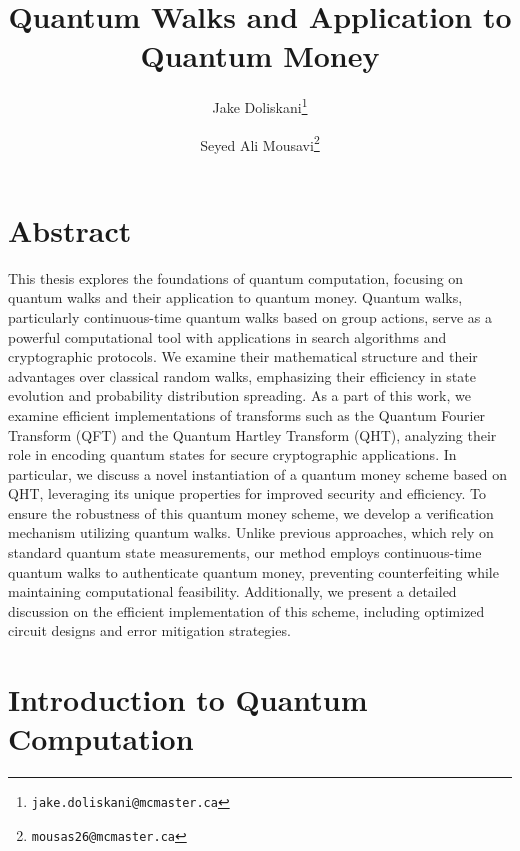 \documentclass[11pt]{article}
\title{Quantum Walks and Application to Quantum Money}
\author{Jake Doliskani\thanks{\tt jake.doliskani@mcmaster.ca} }
\author{Seyed Ali Mousavi\thanks{\tt mousas26@mcmaster.ca} }
\affil{Department of Computing and Software, McMaster University}
\date{}
\theoremstyle{definition}
\begin{document}
\maketitle

\newpage
\section*{Abstract}

This thesis explores the foundations of quantum computation, focusing on quantum walks and their application to quantum money. Quantum walks, particularly continuous-time quantum walks based on group actions, serve as a powerful computational tool with applications in search algorithms and cryptographic protocols. We examine their mathematical structure and their advantages over classical random walks, emphasizing their efficiency in state evolution and probability distribution spreading. As a part of this work, we examine efficient implementations of transforms such as the Quantum Fourier Transform (QFT) and the Quantum Hartley Transform (QHT), analyzing their role in encoding quantum states for secure cryptographic applications. In particular, we discuss a novel instantiation of a quantum money scheme based on QHT, leveraging its unique properties for improved security and efficiency.
To ensure the robustness of this quantum money scheme, we develop a verification mechanism utilizing quantum walks. Unlike previous approaches, which rely on standard quantum state measurements, our method employs continuous-time quantum walks to authenticate quantum money, preventing counterfeiting while maintaining computational feasibility. Additionally, we present a detailed discussion on the efficient implementation of this scheme, including optimized circuit designs and error mitigation strategies.






\newpage
\section{Introduction to Quantum Computation}
\label{sec:intro}




\end{document}
